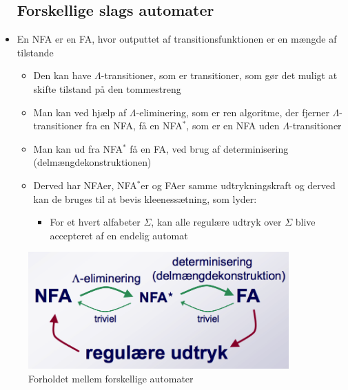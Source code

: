 \documentclass[a4, danish]{article}
\begin{document}
\begin{itemize}
\subsection{Forskellige slags automater}
    \item En NFA er en FA, hvor outputtet af transitionsfunktionen er en mængde af tilstande
    \begin{itemize}
  	  \item Den kan have $\Lambda$-transitioner, som er transitioner, som gør det muligt at skifte tilstand på den tommestreng
      \item Man kan ved hjælp af $\Lambda$-eliminering, som er ren algoritme, der fjerner $\Lambda$-transitioner fra en NFA, få en NFA$^*$, som er en NFA uden   $\Lambda$-transitioner 
      \item Man kan ud fra NFA$^*$ få en FA, ved brug af determinisering (delmængdekonstruktionen)
      \item Derved har NFAer, NFA$^*$er og FAer samme udtrykningskraft og derved kan de bruges til at bevis kleenessætning, som lyder:
      \begin{itemize}
    	  \item For et hvert alfabeter $\Sigma$, kan alle regulære udtryk over $\Sigma$ blive accepteret af en endelig automat
      \end{itemize}
     \end{itemize}
  \end{itemize}
  \begin{figure}[ht!]
	  \centering
	  \includegraphics[width=100mm]{img/automater}
	  \caption{Forholdet mellem forskellige automater	\label{automater2}}
  \end{figure}
 
\end{document}
